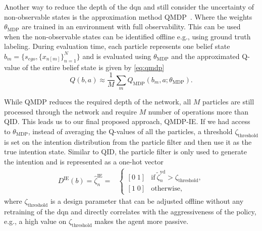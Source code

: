 Another way to reduce the depth of the \gls{dqn} and still consider the uncertainty of non-observable states is the approximation method QMDP~\cite{Littman1995}. Where the weights $\theta_\mathrm{MDP}$ are trained in an environment with full observability. This can be used when the non-observable states can be identified offline e.g., using ground truth labeling. During evaluation time, each particle represents one belief state $b_m = \{ s_{ego}, \{x_{n[m]}\}_{n=1}^N  \}$ and is evaluated using $\theta_\mathrm{MDP}$ and the approximated Q-value of the entire belief state is given by \ref{eq:qmdp} 
\begin{equation}
    Q(b, a) \approx \frac{1}{M} \sum_m Q_{\mathrm{MDP}}(b_{m}, a; \theta_\mathrm{MDP}).
\end{equation}

While QMDP reduces the required depth of the network, all $M$ particles are still processed through the network and require $M$ number of operations more than QID. 
This leads us to our final proposed approach, QMDP-IE. If we had access to $\theta_\mathrm{MDP}$, instead of averaging the Q-values of all the particles, a threshold $\zeta_\text{threshold}$ is set on the intention distribution from the particle filter and then use it as the true intention state. 
Similar to QID, the particle filter is only used to generate the intention and is represented as a one-hot vector
\begin{align}
D^\mathrm{IE}(b) = \hat{\zeta}^\mathrm{IE}_n = & \begin{cases}
[0 \; 1] & \text{if} \ \tilde{\zeta}_n^\text{yd} > \zeta_\text{threshold},\\
[1 \; 0] & \text{otherwise,}
\label{eq:IE_i}
\end{cases} 
\end{align}
where $\zeta_\text{threshold}$ is a design parameter that can be adjusted offline without any retraining of the \gls{dqn} and directly correlates with the aggressiveness of the policy, e.g., a high value on $\zeta_\text{threshold}$ makes the agent more passive. 

